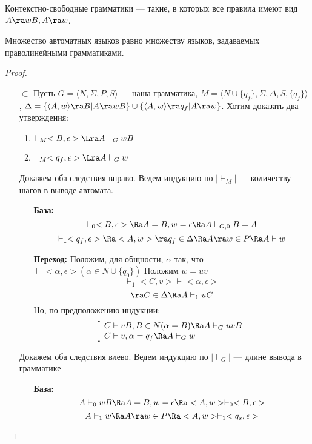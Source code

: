 \begin{definition}
    Контекстно-свободные грамматики --- такие, в которых все правила имеют вид \(A \ra wB, A \ra w\).
\end{definition}

\begin{theorem}
    Множество автоматных языков равно множеству языков, задаваемых праволинейными грамматиками.
\end{theorem}
\begin{proof}
    \begin{enumerate}
        \item[\(\subset\)] Пусть \(G = \langle N, \Sigma, P, S \rangle\) --- наша грамматика, \(M = \langle N \cup \{q_f\}, \Sigma, \Delta, S, \{q_f\} \rangle\), \(\Delta = \{\langle A, w \rangle \ra B | A \ra wB\} \cup \{\langle A, w \rangle \ra q_f | A \ra w\}\). Хотим доказать два утверждения:
        
        \begin{enumerate}
            \item \(<A, w> \vdash_M <B, \epsilon> \Lra A \vdash_G wB\)
            \item \(<A, w> \vdash_M <q_f, \epsilon> \Lra A \vdash_G w\)
        \end{enumerate}
        Докажем оба следствия вправо. Ведем индукцию по \(|\vdash_M|\) --- количеству шагов в выводе автомата.
        \begin{enumerate}
            \item[] \textbf{База:}
            \[<A, w> \vdash_0 <B, \epsilon> \Ra A = B, w = \epsilon \Ra A \vdash_{G, 0} B = A\]
            \[<A, w> \vdash_1 <q_f, \epsilon> \Ra <A, w> \ra q_f \in \Delta \Ra A \ra w \in P \Ra A \vdash w\]
            \item[] \textbf{Переход:}
            Положим, для общности, \(\alpha\) так, что \(<A, w> \vdash <\alpha, \epsilon> (\alpha \in N \cup \{q_0\})\)
            Положим \(w = uv\)
            \[<A, uv> \vdash_1 <C, v> \vdash <\alpha, \epsilon>\]
            \[<A, uv> \ra C \in \Delta \Ra A \vdash_1 uC\]
            Но, по предположению индукции:
            \[\left[\begin{array}{l}
                C \vdash vB, B \in N (\alpha = B) \Ra A \vdash_G uvB\\
                C \vdash v, \alpha = q_f  \Ra A \vdash_G w\\
            \end{array}\right.\]
        \end{enumerate}
        Докажем оба следствия влево. Ведем индукцию по \(|\vdash_G|\) --- длине вывода в грамматике
        \begin{enumerate}
            \item[] \textbf{База:}
            \[A \vdash_0 wB \Ra A = B, w = \epsilon \Ra <A, w> \vdash_0 <B, \epsilon>\]
            \[A \vdash_1 w \Ra A \ra w \in P \Ra <A, w> \vdash_1 <q_s, \epsilon>\]


\end{enumerate}
\end{enumerate}
\end{proof}
